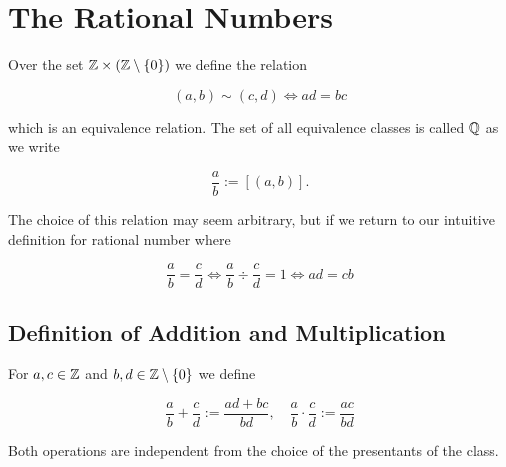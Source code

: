 \chapter{The Rational Numbers}

Over the set \(\mathbb{Z} \times (\mathbb{Z} \setminus \{0\})\) we define the relation

\[
	(a, b) \sim (c, d) \iff ad = bc
\]

which is an equivalence relation. The set of all equivalence classes is called \(\mathbb{Q}\) as we write

\[
	\frac{a}{b} := [(a, b)].
\]

The choice of this relation may seem arbitrary, but if we return to our intuitive definition for rational number where

\[
	\frac{a}{b} = \frac{c}{d} \iff \frac{a}{b} \div \frac{c}{d} = 1 \iff ad = cb
\]

\section{Definition of Addition and Multiplication}

For \(a, c \in \mathbb{Z}\) and \(b, d \in \mathbb{Z} \setminus \{0\}\) we define

\[
	\frac{a}{b} + \frac{c}{d} := \frac{ad + bc}{bd}, \quad \frac{a}{b} \cdot \frac{c}{d} := \frac{ac}{bd}
\]

Both operations are independent from the choice of the presentants of the class.
